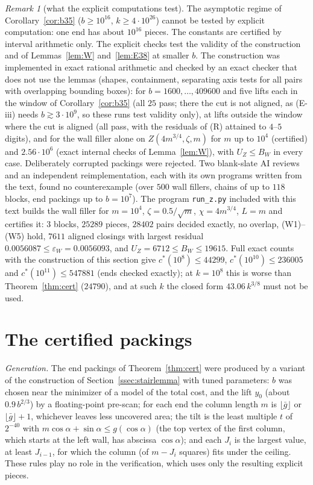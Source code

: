 \documentclass[11pt]{amsart}
\newcommand{\cs}{c^{*}}
\newcommand{\ca}{\cos\alpha}
\newcommand{\sa}{\sin\alpha}
\theoremstyle{definition}
\theoremstyle{remark}
\newtheorem{remark}[theorem]{Remark}
\numberwithin{equation}{section}
\begin{document}
\begin{remark}[what the explicit computations test]\label{rem:38exact}
The asymptotic regime of Corollary~\ref{cor:b35} ($b\ge10^{16}$, $k\ge4\cdot10^{26}$) cannot be tested by explicit
computation: one end has about $10^{16}$ pieces. The constants are certified by interval arithmetic only. The explicit
checks test the validity of the construction and of Lemmas~\ref{lem:W} and~\ref{lem:E38} at smaller $b$. The
construction was implemented in exact rational arithmetic and checked by an exact checker that does not use the lemmas
(shapes, containment, separating axis tests for all pairs with overlapping bounding boxes): for $b=1600,\dots,409600$ and
five lifts each in the window of Corollary~\ref{cor:b35} (all $25$ pass; there the cut is not aligned, as (E-iii) needs
$b\gtrsim3\cdot10^9$, so these runs test validity only), at lifts outside the window where the cut is aligned (all pass,
with the residuals of (R) attained to $4$--$5$ digits), and for the wall filler alone on $Z(4m^{3/4},\zeta,m)$ for $m$ up to
$10^4$ (certified) and $2.56\cdot10^6$ (exact internal checks of Lemma~\ref{lem:W}), with $U_Z\le B_W$ in every case.
Deliberately corrupted packings were rejected. Two blank-slate AI reviews and an independent reimplementation, each with
its own programs written from the text, found no counterexample (over $500$ wall fillers, chains of up to $118$ blocks,
end packings up to $b=10^7$). The program \texttt{run\_z.py} included with this text builds the wall filler for
$m=10^4$, $\zeta=0.5/\sqrt m$, $\chi=4m^{3/4}$, $L=m$ and certifies it: $3$ blocks, $25289$ pieces, $28402$ pairs decided
exactly, no overlap, (W1)--(W5) hold, $7611$ aligned closings with largest residual $0.0056087\le\varepsilon_W=0.0056093$,
and $U_Z=6712\le B_W\le19615$. Full exact counts with the construction of this section give $\cs(10^8)\le44299$,
$\cs(10^{10})\le236005$ and $\cs(10^{11})\le547881$ (ends checked exactly); at $k=10^8$ this is worse than
Theorem~\ref{thm:cert} ($24790$), and at such $k$ the closed form $43.06\,k^{3/8}$ must not be used.
\end{remark}

\section{The certified packings}\label{sec:cert}

\emph{Generation.} The end packings of Theorem~\ref{thm:cert} were produced by a variant of the construction of
Section~\ref{ssec:stairlemma} with tuned parameters: $b$ was chosen near the minimizer of a model of the total cost, and the lift $y_0$ (about
$0.9\,b^{2/3}$) by a floating-point pre-scan; for each end the column length $m$ is $\lfloor\bar g\rfloor$ or $\lfloor\bar g\rfloor+1$,
whichever leaves less uncovered area; the tilt is the least multiple $t$ of $2^{-40}$ with
$m\ca+\sa\le g(\ca)$ (the top vertex of the first column, which starts at the left wall, has abscissa $\ca$); and each $J_i$ is the largest value, at least $J_{i-1}$, for which the column (of $m-J_i$ squares) fits under the ceiling.
These rules play no role in the verification, which uses only the resulting explicit pieces.
\end{document}
